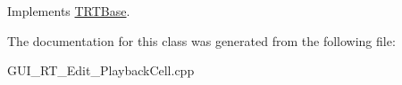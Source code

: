 Implements \hyperlink{class_t_r_t_base_ab83e520005e20ee71f98f3e85e1ee6d4}{T\+R\+T\+Base}.



The documentation for this class was generated from the following file\+:\begin{DoxyCompactItemize}
\item 
G\+U\+I\+\_\+\+R\+T\+\_\+\+Edit\+\_\+\+Playback\+Cell.\+cpp\end{DoxyCompactItemize}
